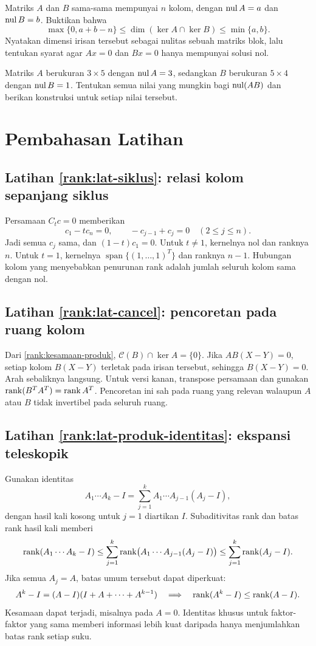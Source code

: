 \begin{latihan}\label{rank:lat-irisan-kernel}
    Matriks $A$ dan $B$ sama-sama mempunyai $n$ kolom, dengan
    $\operatorname{nul} A=a$ dan $\operatorname{nul} B=b$.
    Buktikan bahwa
    \[
        \max\{0,a+b-n\}\le\dim(\ker A\cap\ker B)\le\min\{a,b\}.
    \]
    Nyatakan dimensi irisan tersebut sebagai nulitas sebuah matriks blok,
    lalu tentukan syarat agar $Ax=0$ dan $Bx=0$ hanya mempunyai solusi nol.
\end{latihan}

\begin{latihan}\label{rank:lat-nulitas-produk}
    Matriks $A$ berukuran $3\times5$ dengan $\operatorname{nul} A=3$, sedangkan
    $B$ berukuran $5\times4$ dengan $\operatorname{nul} B=1$.
    Tentukan semua nilai yang mungkin bagi $\operatorname{nul}(AB)$ dan berikan
    konstruksi untuk setiap nilai tersebut.
\end{latihan}

\ifpembahasan
\section{Pembahasan Latihan}
\label{rank:pembahasan}

\subsection*{Latihan \ref{rank:lat-siklus}: relasi kolom sepanjang siklus}
Persamaan $C_tc=0$ memberikan
\[
    c_1-tc_n=0,\qquad -c_{j-1}+c_j=0\quad(2\le j\le n).
\]
Jadi semua $c_j$ sama, dan $(1-t)c_1=0$.
Untuk $t\ne1$, kernelnya nol dan ranknya $n$.
Untuk $t=1$, kernelnya $\operatorname{span}\{(1,\ldots,1)^T\}$
dan ranknya $n-1$. Hubungan kolom yang menyebabkan penurunan rank
adalah jumlah seluruh kolom sama dengan nol.

\subsection*{Latihan \ref{rank:lat-cancel}: pencoretan pada ruang kolom}
Dari \autoref{rank:kesamaan-produk},
$\mathcal C(B)\cap\ker A=\{0\}$.
Jika $AB(X-Y)=0$, setiap kolom $B(X-Y)$ terletak pada irisan tersebut,
sehingga $B(X-Y)=0$. Arah sebaliknya langsung.
Untuk versi kanan, transpose persamaan dan gunakan
$\operatorname{rank}(B^TA^T)=\operatorname{rank} A^T$. Pencoretan ini sah pada ruang yang relevan
walaupun $A$ atau $B$ tidak invertibel pada seluruh ruang.

\subsection*{Latihan \ref{rank:lat-produk-identitas}: ekspansi teleskopik}
Gunakan identitas
\[
    A_1\cdots A_k-I
    =\sum_{j=1}^k A_1\cdots A_{j-1}(A_j-I),
\]
dengan hasil kali kosong untuk $j=1$ diartikan $I$.
Subaditivitas rank dan batas rank hasil kali memberi
\[
    \operatorname{rank}(A_1\cdots A_k-I)
    \le\sum_{j=1}^k\operatorname{rank}\bigl(A_1\cdots A_{j-1}(A_j-I)\bigr)
    \le\sum_{j=1}^k\operatorname{rank}(A_j-I).
\]
Jika semua $A_j=A$, batas umum tersebut dapat diperkuat:
\[
    A^k-I=(A-I)(I+A+\cdots+A^{k-1})
    \quad\Longrightarrow\quad
    \operatorname{rank}(A^k-I)\le\operatorname{rank}(A-I).
\]
Kesamaan dapat terjadi, misalnya pada $A=0$.
Identitas khusus untuk faktor-faktor yang sama memberi informasi
lebih kuat daripada hanya menjumlahkan batas rank setiap suku.

